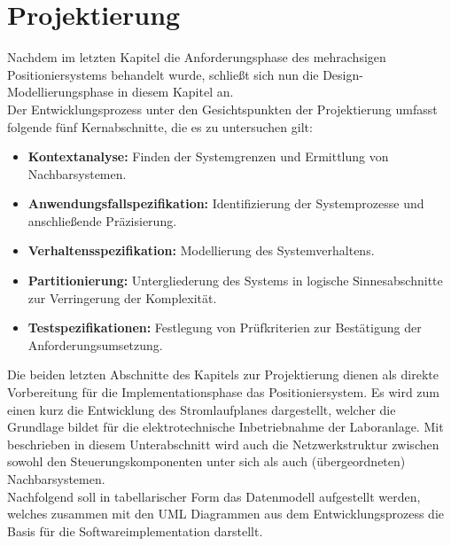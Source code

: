 \documentclass[../../Bachelorarbeit.tex]{subfiles}
\begin{document}
\section{Projektierung}
Nachdem im letzten Kapitel die Anforderungsphase des mehrachsigen Positioniersystems behandelt wurde, schließt sich nun die Design- \bzw Modellierungsphase in diesem Kapitel an.\\
Der Entwicklungsprozess unter den Gesichtspunkten der Projektierung umfasst folgende fünf Kernabschnitte, die es zu untersuchen gilt:

\begin{itemize}
    \item \textbf{Kontextanalyse:} Finden der Systemgrenzen und Ermittlung von Nachbarsystemen.
    \item \textbf{Anwendungsfallspezifikation:} Identifizierung der Systemprozesse und anschließende Präzisierung.
    \item \textbf{Verhaltensspezifikation:} Modellierung des Systemverhaltens.
    \item \textbf{Partitionierung:} Untergliederung des Systems in logische Sinnesabschnitte zur Verringerung der Komplexität.
    \item \textbf{Testspezifikationen:} Festlegung von Prüfkriterien zur Bestätigung der Anforderungsumsetzung.
\end{itemize}

Die beiden letzten Abschnitte des Kapitels zur Projektierung dienen als direkte Vorbereitung für die Implementationsphase das Positioniersystem. Es wird zum einen kurz die Entwicklung des Stromlaufplanes dargestellt, welcher die Grundlage bildet für die elektrotechnische Inbetriebnahme der Laboranlage. Mit beschrieben in diesem Unterabschnitt wird auch die Netzwerkstruktur zwischen sowohl den Steuerungskomponenten unter sich als auch (übergeordneten) Nachbarsystemen. \\
Nachfolgend soll in tabellarischer Form das Datenmodell aufgestellt werden, welches zusammen mit den UML Diagrammen aus dem Entwicklungsprozess die Basis für die Softwareimplementation darstellt.
\end{document}
